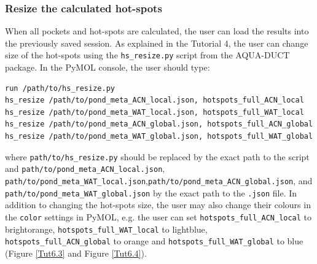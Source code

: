 \documentclass[9pt,tutorial, pubversion]{livecoms}
\begin{document}
\subsubsection{Resize the calculated hot-spots}
When all pockets and hot-spots are calculated, the user can load the results into the previously saved session. As explained in the Tutorial 4, the user can change size of the hot-spots using the \texttt{hs\_resize.py} script from the AQUA-DUCT package. In the PyMOL console, the user should type:
\begin{lstlisting}[columns=fullflexible]
run /path/to/hs_resize.py
hs_resize /path/to/pond_meta_ACN_local.json, hotspots_full_ACN_local
hs_resize /path/to/pond_meta_WAT_local.json, hotspots_full_WAT_local
hs_resize /path/to/pond_meta_ACN_global.json, hotspots_full_ACN_global
hs_resize /path/to/pond_meta_WAT_global.json, hotspots_full_WAT_global
\end{lstlisting}
where \texttt{path/to/hs\_resize.py} should be replaced by the exact path to the script and \texttt{path/to/pond\_meta\_ACN\_local.json}, \texttt{path/to/pond\_meta\_WAT\_local.json},\newline \texttt{path/to/pond\_meta\_ACN\_global.json}, and \newline \texttt{path/to/pond\_meta\_WAT\_global.json} by the exact path to the \texttt{.json} file.
In addition to changing the hot-spots size, the user may also change their colours in the \texttt{color} settings in PyMOL, e.g. the user can set \texttt{hotspots\_full\_ACN\_local} to brightorange, \texttt{hotspots\_full\_WAT\_local} to lightblue, \texttt{hotspots\_full\_ACN\_global} \hfill to \hfill orange \hfill and \newline \texttt{hotspots\_full\_WAT\_global} to blue (Figure \ref{Tut6.3} and Figure \ref{Tut6.4}).
\end{document}
